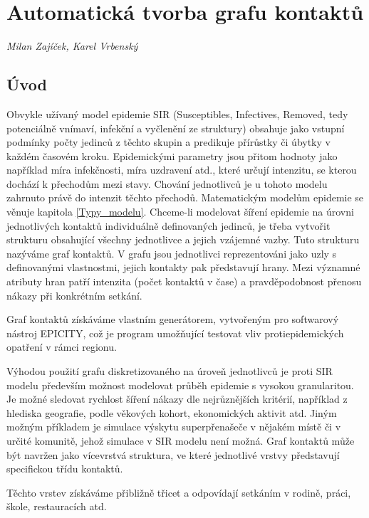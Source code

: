 
\chapter{Automatická tvorba grafu kontaktů}\label{Grafy_kontaktu}

\textit{Milan Zajíček, Karel Vrbenský}
\vspace{15mm}

\section*{Úvod}

Obvykle užívaný model epidemie SIR (Susceptibles, Infectives, Removed, tedy potenciálně vnímaví, infekční a vyčlenění ze struktury) obsahuje jako vstupní podmínky počty jedinců z těchto skupin a predikuje přírůstky či úbytky v každém časovém kroku. Epidemickými parametry jsou přitom hodnoty jako například míra infekčnosti, míra uzdravení atd., které určují intenzitu, se kterou dochází k přechodům mezi stavy. Chování jednotlivců je u tohoto modelu zahrnuto právě do intenzit těchto přechodů. Matematickým modelům epidemie se věnuje kapitola \ref{Typy_modelu}. Chceme-li modelovat šíření epidemie na úrovni jednotlivých kontaktů individuálně definovaných jedinců, je třeba vytvořit strukturu obsahující všechny jednotlivce a jejich vzájemné vazby. Tuto strukturu nazýváme graf kontaktů. V grafu jsou jednotlivci reprezentováni jako uzly s definovanými vlastnostmi, jejich kontakty pak představují hrany. Mezi významné atributy hran patří intenzita (počet kontaktů v čase) a pravděpodobnost přenosu nákazy při konkrétním setkání. 

Graf kontaktů získáváme vlastním generátorem, vytvořeným pro softwarový nástroj EPICITY, což je program umožňující testovat vliv protiepidemických opatření v rámci regionu.

Výhodou použití grafu diskretizovaného na úroveň jednotlivců je proti SIR modelu především možnost modelovat průběh epidemie s vysokou granularitou. Je možné sledovat rychlost šíření nákazy dle nejrůznějších kritérií, například z hlediska geografie, podle věkových kohort, ekonomických aktivit atd.  Jiným možným příkladem je simulace výskytu superpřenašeče v nějakém místě či v určité komunitě, jehož simulace v SIR modelu není možná.
Graf kontaktů může být navržen jako vícevrstvá struktura, ve které jednotlivé vrstvy představují specifickou třídu kontaktů. 


Těchto vrstev získáváme přibližně třicet a odpovídají setkáním v rodině, práci, škole, restauracích atd.


